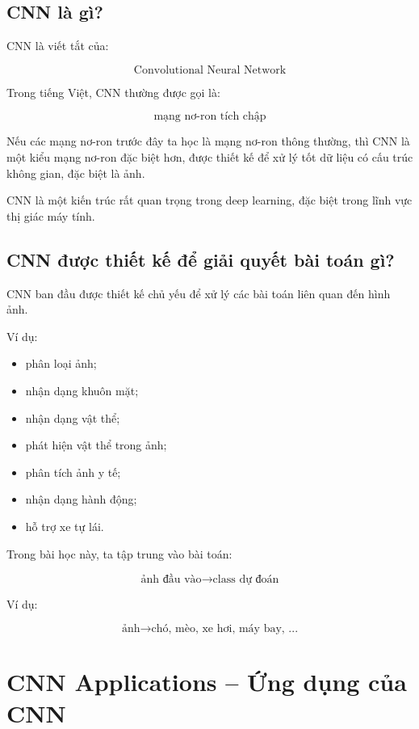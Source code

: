 \subsection{CNN là gì?}

CNN là viết tắt của:

\[
    \text{Convolutional Neural Network}
\]

Trong tiếng Việt, CNN thường được gọi là:

\[
    \text{mạng nơ-ron tích chập}
\]

Nếu các mạng nơ-ron trước đây ta học là mạng nơ-ron thông thường, thì CNN là một kiểu mạng nơ-ron đặc biệt hơn, được thiết kế để xử lý tốt dữ liệu có cấu trúc không gian, đặc biệt là ảnh.

\begin{ghinho}
CNN là một kiến trúc rất quan trọng trong deep learning, đặc biệt trong lĩnh vực thị giác máy tính.
\end{ghinho}

\subsection{CNN được thiết kế để giải quyết bài toán gì?}

CNN ban đầu được thiết kế chủ yếu để xử lý các bài toán liên quan đến hình ảnh.

Ví dụ:

\begin{itemize}
    \item phân loại ảnh;
    \item nhận dạng khuôn mặt;
    \item nhận dạng vật thể;
    \item phát hiện vật thể trong ảnh;
    \item phân tích ảnh y tế;
    \item nhận dạng hành động;
    \item hỗ trợ xe tự lái.
\end{itemize}

Trong bài học này, ta tập trung vào bài toán:

\[
    \text{ảnh đầu vào}
    \longrightarrow
    \text{class dự đoán}
\]

Ví dụ:

\[
    \text{ảnh}
    \longrightarrow
    \text{chó, mèo, xe hơi, máy bay, ...}
\]

\section{CNN Applications -- Ứng dụng của CNN}

